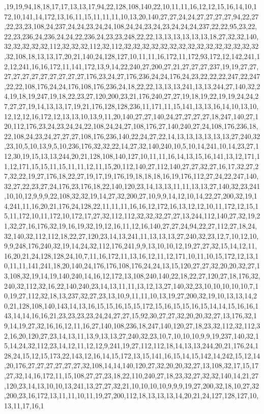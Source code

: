 ,19,19,94,18,18,17,17,13,13,17,94,22,128,108,140,22,10,11,11,16,12,12,15,16,14,10,172,10,141,14,172,13,16,11,15,11,11,11,10,13,20,140,27,27,24,24,27,27,27,27,94,22,27,22,23,23,108,24,237,24,24,23,24,24,108,24,24,23,24,23,24,24,24,237,22,22,95,23,22,22,23,236,24,236,24,24,22,236,24,23,23,248,22,22,13,13,13,13,13,13,18,27,32,32,140,32,32,32,32,32,112,32,32,32,112,32,112,32,32,32,32,32,32,32,32,32,32,32,32,32,32,32,32,108,18,13,13,17,20,21,140,24,128,127,10,11,11,16,172,11,172,93,172,12,142,241,12,12,241,16,16,172,11,141,172,13,9,14,22,240,27,200,27,21,27,27,27,237,19,19,27,27,27,27,27,27,27,27,27,27,27,176,23,24,27,176,236,24,24,176,24,23,22,22,22,247,22,247,22,22,108,176,24,24,176,108,176,236,24,18,22,22,13,13,13,241,13,13,244,27,140,32,24,19,18,19,247,19,18,22,23,27,120,200,23,21,176,240,27,27,19,18,19,22,19,19,24,24,27,27,27,19,14,13,13,17,19,21,176,128,128,236,11,171,11,15,141,13,13,16,14,10,13,10,12,12,12,16,172,12,13,13,10,13,9,11,20,140,27,27,140,24,27,27,27,27,18,247,140,27,120,112,176,23,24,23,24,24,22,108,24,24,27,108,176,27,140,240,27,24,108,176,236,18,22,108,24,23,24,27,27,27,108,176,236,140,22,24,27,22,14,13,13,13,13,13,13,27,240,32,23,10,5,10,13,9,5,10,236,176,32,32,22,14,27,32,140,240,10,5,10,14,241,10,14,23,27,112,30,19,15,13,13,244,20,21,128,108,140,127,10,11,11,16,14,13,15,16,141,13,12,171,11,12,171,15,15,11,15,11,11,12,11,15,20,112,140,27,112,140,27,27,32,27,16,17,32,27,27,32,22,19,27,176,18,22,27,19,17,19,176,19,18,18,18,16,19,176,112,27,24,22,247,140,32,27,22,23,27,24,176,23,176,18,22,140,120,23,14,13,13,11,11,13,13,27,140,32,23,241,10,10,12,9,9,9,22,108,32,32,19,14,27,32,200,27,10,9,9,14,12,10,14,22,27,200,32,19,14,241,11,16,20,21,176,24,128,22,11,11,11,16,16,12,172,16,13,12,12,10,11,172,12,15,15,11,172,10,11,172,10,172,17,27,32,112,112,32,32,32,27,27,13,244,112,140,27,32,19,21,32,27,16,176,32,19,16,19,32,19,12,16,11,12,16,140,27,27,24,94,22,27,112,27,18,24,32,140,32,112,112,18,22,27,120,23,14,13,241,11,13,13,13,27,240,32,23,12,7,10,12,10,9,9,248,176,240,32,19,14,24,32,112,176,241,9,9,13,10,10,12,19,27,27,32,15,14,12,11,16,20,21,24,128,128,24,10,7,11,16,172,11,13,16,12,11,12,171,10,11,10,15,172,12,13,10,11,11,141,241,18,20,140,24,176,176,108,176,24,24,13,15,120,27,27,32,20,20,32,27,13,108,32,19,14,19,140,240,14,16,12,172,13,108,240,140,22,18,22,27,120,27,18,176,32,240,32,112,32,16,22,140,240,23,14,13,11,11,13,12,13,27,140,32,23,10,10,10,10,10,7,10,19,27,112,32,18,13,237,32,27,23,13,10,9,11,11,10,13,19,27,200,32,19,10,13,13,14,20,21,128,108,140,143,14,13,16,15,15,16,15,15,172,15,16,15,15,16,15,14,14,15,16,16,143,14,14,16,16,21,23,23,23,23,24,24,27,27,15,92,30,27,27,32,20,20,32,27,13,176,32,19,14,19,27,32,16,16,12,11,16,27,140,108,236,18,247,140,120,27,18,23,32,112,32,112,32,16,20,120,27,23,14,13,11,13,9,13,13,27,240,32,23,10,7,10,10,10,9,9,19,237,140,32,15,14,24,32,112,23,14,12,11,12,12,9,241,19,27,112,112,18,14,13,13,244,20,21,176,24,128,24,15,12,15,173,22,143,12,16,14,15,172,13,15,141,16,15,14,15,142,14,242,15,12,14,20,176,27,27,27,27,27,27,32,108,14,14,140,120,27,32,20,20,32,27,13,108,32,17,15,17,27,32,14,16,172,11,15,108,27,27,23,18,22,110,240,27,18,23,32,27,32,32,140,14,21,27,120,23,14,13,10,10,13,241,13,27,27,32,21,10,10,10,10,9,9,9,19,27,200,32,18,10,27,32,200,23,16,172,13,11,11,10,11,19,27,200,112,18,13,13,13,14,20,21,24,127,128,127,10,13,11,17,16,1